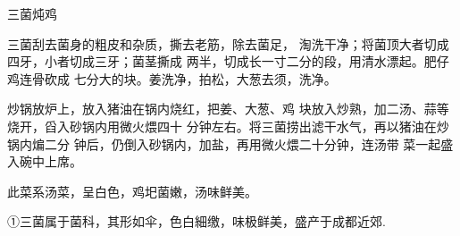 \begin{recipe}{三菌炖鸡}

\ingredients


\cooking

\step 三菌刮去菌身的粗皮和杂质，撕去老筋，除去菌足， 淘洗干净；将菌顶大者切成四牙，小者切成三牙；菌茎撕成 两半，切成长一寸二分的段，用清水漂起。肥仔鸡连骨砍成 七分大的块。姜洗净，拍松，大葱去须，洗净。

\step 炒锅放炉上，放入猪油在锅内烧红，把姜、大葱、鸡 块放入炒熟，加二汤、蒜等烧开，舀入砂锅内用微火煨四十 分钟左右。将三菌捞出滤干水气，再以猪油在炒锅内煸二分 钟后，仍倒入砂锅内，加盐，再用微火煨二十分钟，连汤带 菜一起盛入碗中上席。

\notes

此菜系汤菜，呈白色，鸡圯菌嫩，汤味鲜美。

①三菌属于菌科，其形如伞，色白細缴，味极鲜美，盛产于成都近郊.

\end{recipe}

